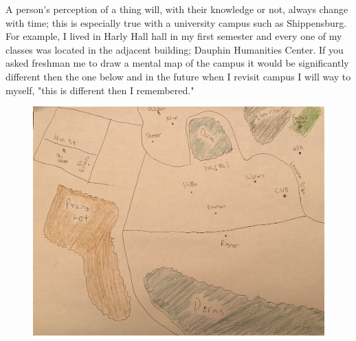 \documentclass{article}
\begin{document}
A person's perception of a thing will, with their knowledge or not, always change with time; this is especially true with a university campus such as Shippensburg. For example, I lived in Harly Hall hall in my first semester and every one of my classes was located in the adjacent building; Dauphin Humanities Center. If you asked freshman me to draw a mental map of the campus it would be significantly different then the one below and in the future when I revisit campus I will way to myself, "this is different then I remembered."

\begin{figure}[t]
\includegraphics[width=\textwidth]{map}
\end{figure}
\end{document}
